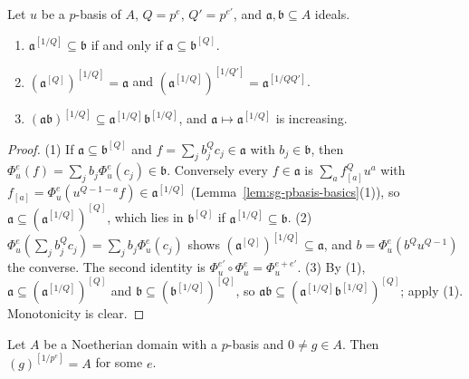 \begin{lemma}\label{lem:sg-root-basic}
\leanok
{}
Let $u$ be a $p$-basis of $A$, $Q=p^e$, $Q'=p^{e'}$, and $\mathfrak a,\mathfrak b\subseteq A$ ideals.
\begin{enumerate}
\item $\mathfrak a^{[1/Q]}\subseteq\mathfrak b$ if and only if $\mathfrak a\subseteq\mathfrak b^{[Q]}$.
\item $(\mathfrak a^{[Q]})^{[1/Q]}=\mathfrak a$ and $(\mathfrak a^{[1/Q]})^{[1/Q']}=\mathfrak a^{[1/QQ']}$.
\item $(\mathfrak a\mathfrak b)^{[1/Q]}\subseteq\mathfrak a^{[1/Q]}\mathfrak b^{[1/Q]}$, and $\mathfrak a\mapsto\mathfrak a^{[1/Q]}$ is increasing.
\end{enumerate}
\end{lemma}

\begin{proof}
(1) If $\mathfrak a\subseteq\mathfrak b^{[Q]}$ and $f=\sum_jb_j^Qc_j\in\mathfrak a$ with $b_j\in\mathfrak b$, then $\Phi^e_u(f)=\sum_jb_j\Phi^e_u(c_j)\in\mathfrak b$. Conversely every
$f\in\mathfrak a$ is $\sum_af_{[a]}^Qu^a$ with $f_{[a]}=\Phi^e_u(u^{Q-1-a}f)\in\mathfrak a^{[1/Q]}$ (Lemma~\ref{lem:sg-pbasis-basics}(1)), so
$\mathfrak a\subseteq(\mathfrak a^{[1/Q]})^{[Q]}$, which lies in $\mathfrak b^{[Q]}$ if $\mathfrak a^{[1/Q]}\subseteq\mathfrak b$.
(2) $\Phi^e_u(\sum_jb_j^Qc_j)=\sum_jb_j\Phi^e_u(c_j)$ shows $(\mathfrak a^{[Q]})^{[1/Q]}\subseteq\mathfrak a$, and $b=\Phi^e_u(b^Qu^{Q-1})$ the converse. The second
identity is $\Phi^{e'}_u\circ\Phi^e_u=\Phi^{e+e'}_u$.
(3) By (1), $\mathfrak a\subseteq(\mathfrak a^{[1/Q]})^{[Q]}$ and $\mathfrak b\subseteq(\mathfrak b^{[1/Q]})^{[Q]}$, so $\mathfrak a\mathfrak b\subseteq(\mathfrak a^{[1/Q]}\mathfrak b^{[1/Q]})^{[Q]}$; apply (1).
Monotonicity is clear.
\end{proof}

\begin{lemma}\label{lem:sg-test-element}
\leanok
{}
Let $A$ be a Noetherian domain with a $p$-basis and $0\ne g\in A$. Then $(g)^{[1/p^e]}=A$ for some $e$.
\end{lemma}


